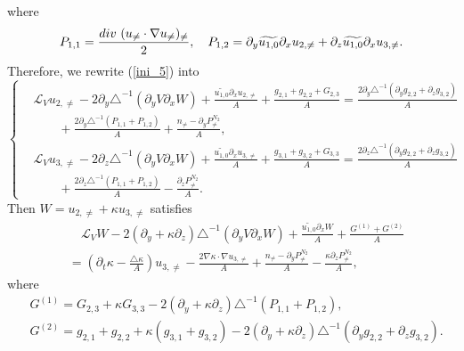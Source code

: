 \documentclass[12pt, reqno]{amsart}
\numberwithin{equation}{section}
\begin{document}
	where $$P_{1,1}=\frac{{\rm div}~(u_{\neq}\cdot\nabla u_{\neq})_{\neq}}{2},
	\quad P_{1,2}=\partial_y\widetilde{ u_{1,0}}\partial_xu_{2,\neq}+
	\partial_z\widetilde{u_{1,0}}\partial_xu_{3,\neq}.$$
	Therefore, we rewrite (\ref{ini_5}) into 
	\begin{equation}\label{ini_6}
		\left\{
		\begin{array}{lr}
			&\mathcal{L}_Vu_{2,\neq}
			-2\partial_y\triangle^{-1}(\partial_yV\partial_xW)
			+\frac{\widetilde{u_{1,0}}\partial_xu_{2,\neq}}{A}
			+\frac{g_{2,1}+g_{2,2}+{G_{2,3}}}{A}
			=\frac{2\partial_y\triangle^{-1}
				(\partial_yg_{2,2}+\partial_zg_{3,2})}{A}
			\\
			&\qquad+\frac{2\partial_y\triangle^{-1}(P_{1,1}+P_{1,2})}{A}
			+\frac{n_{\neq}-\partial_y P^{N_2}_{\neq}}{A},\\
			&\mathcal{L}_Vu_{3,\neq}-2\partial_z\triangle^{-1}(\partial_yV\partial_xW)
			+\frac{\widetilde{u_{1,0}}\partial_xu_{3,\neq}}{A}
			+\frac{g_{3,1}+g_{3,2}+{G_{3,3}}}{A}
			=\frac{2\partial_z\triangle^{-1}
				(\partial_yg_{2,2}+\partial_zg_{3,2})}{A}\\
			&\qquad+\frac{2\partial_z\triangle^{-1}(P_{1,1}+P_{1,2})}{A}
			-\frac{\partial_z P^{N_2}_{\neq}}{A}.
		\end{array}
		\right.
	\end{equation}
	Then $W=u_{2,\neq}+\kappa u_{3,\neq}$ satisfies 
	\begin{equation*}
		\begin{aligned}
			&\quad \mathcal{L}_VW
			-2(\partial_y+\kappa\partial_z)\triangle^{-1}(\partial_yV\partial_xW)+\frac{\widetilde{u_{1,0}}\partial_x W}{A}
			+\frac{G^{(1)}+G^{(2)}}{A}\\
			&=(\partial_t\kappa-\frac{\triangle\kappa}{A})u_{3,\neq}-\frac{2\nabla\kappa\cdot\nabla u_{3,\neq}}{A}+\frac{n_{\neq}-\partial_yP^{N_2}_{\neq}}{A}-\frac{\kappa\partial_zP^{N_2}_{\neq}}{A},
		\end{aligned}
	\end{equation*}
	where
	\begin{equation}\label{G11}
		\begin{aligned}
			&G^{(1)}=G_{2,3}+\kappa G_{3,3}-2(\partial_y+\kappa\partial_z)
			\triangle^{-1}(P_{1,1}+P_{1,2}),\\
			&G^{(2)}=g_{2,1}+g_{2,2}+\kappa(g_{3,1}+g_{3,2})
			-2(\partial_y+\kappa\partial_z)
			\triangle^{-1}(\partial_yg_{2,2}+\partial_zg_{3,2}).
		\end{aligned}
	\end{equation} 
	
\end{document}
